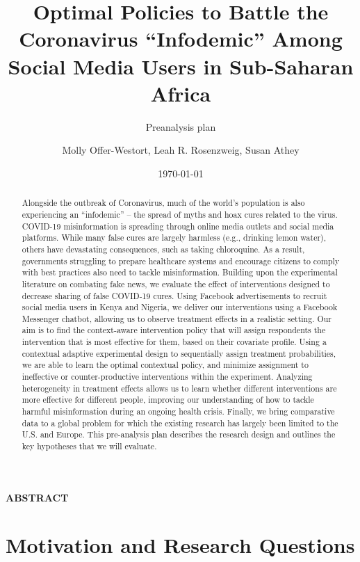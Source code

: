 \documentclass[letterpaper, 12pt, parskip=full,]{scrartcl}
\title{Optimal Policies to Battle the Coronavirus ``Infodemic'' Among Social Media Users in Sub-Saharan Africa}
\subtitle{Preanalysis plan}
\author{Molly Offer-Westort, Leah R. Rosenzweig, Susan Athey}
\date{\today}
\begin{document}
%
\normalsize%
\maketitle%
\tableofcontents%
\clearpage%


\centerline{\textbf{ABSTRACT}}
\begin{abstract}
Alongside the outbreak of Coronavirus, much of the world’s population is also experiencing an “infodemic” -- the spread of myths and hoax cures related to the virus. COVID-19 misinformation is spreading through online media outlets and social media platforms. While many false cures are largely harmless (e.g., drinking lemon water), others have devastating consequences, such as taking chloroquine. As a result, governments struggling to prepare healthcare systems and encourage citizens to comply with best practices also need to tackle misinformation. Building upon the experimental literature on combating fake news, we evaluate the effect of interventions designed to decrease sharing of false COVID-19 cures. Using Facebook advertisements to recruit social media users in Kenya and Nigeria, we deliver our interventions using a Facebook Messenger chatbot, allowing us to observe treatment effects in a realistic setting. Our aim is to find the context-aware intervention policy that will assign respondents the intervention that is most effective for them, based on their covariate profile. Using a contextual adaptive experimental design to sequentially assign treatment probabilities, we are able to learn the optimal contextual policy, and minimize assignment to ineffective or counter-productive interventions within the experiment. Analyzing heterogeneity in treatment effects allows us to learn whether different interventions are more effective for different people, improving our understanding of how to tackle harmful misinformation during an ongoing health crisis. Finally, we bring comparative data to a global problem for which the existing research has largely been limited to the U.S. and Europe. This pre-analysis plan describes the research design and outlines the key hypotheses that we will evaluate.
\end{abstract}





\section{Motivation and Research Questions}
\end{document}
